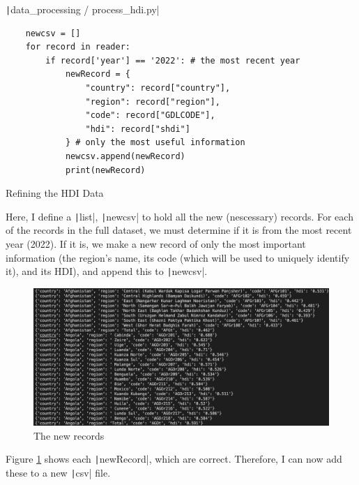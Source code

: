 \documentclass[12pt]{report}
\newcommand{\pil}[1]{\protect\texttt|#1|}
\begin{document}
\begin{listing}[H]
\pil{data_processing / process_hdi.py}
\begin{verbatim}
    newcsv = []
    for record in reader:
        if record['year'] == '2022': # the most recent year
            newRecord = {
                "country": record["country"],
                "region": record["region"],
                "code": record["GDLCODE"],
                "hdi": record["shdi"]
            } # only the most useful information
            newcsv.append(newRecord)
            print(newRecord)
\end{verbatim}
\caption{Refining the HDI Data}\label{cs:refineHDI}
\end{listing}
Here, I define a \pil{list}, \pil{newcsv} to hold all the new (nescessary) records. For each of the records in the full dataset, we must determine if it is from the most recent year (2022). If it is, we make a new record of only the most important information (the region's name, its code (which will be used to uniquely identify it), and its HDI), and append this to \pil{newcsv}.

\begin{figure}[H]
\centering
\includegraphics[width=12cm]{ss1.2.png}
\caption{The new records}\label{fig:ss1.2}
\end{figure}
Figure \ref{fig:ss1.2} shows each \pil{newRecord}, which are correct. Therefore, I can now add these to a new \pil{csv} file.

\begin{center}
\end{center}
\end{document}
